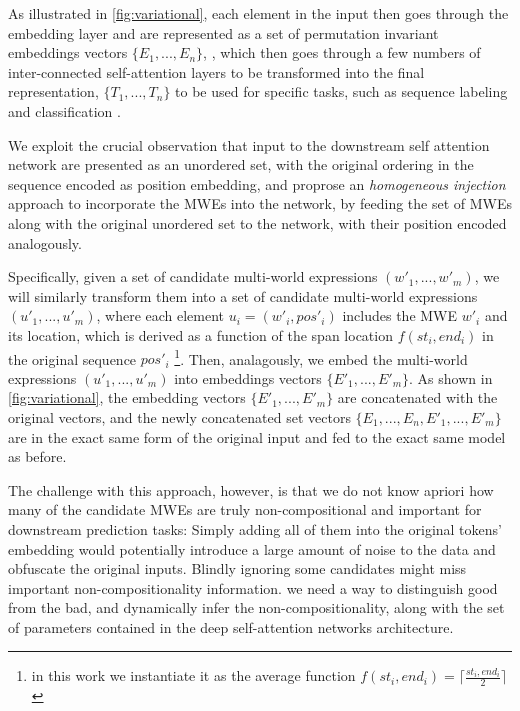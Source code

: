 As illustrated in \autoref{fig:variational}, each element in the input then goes through the embedding layer and are represented as a set of permutation invariant embeddings vectors $\{E_1, ..., E_n\}$, 
\cite{vaswani2017attention}, 
which then goes through a few numbers of inter-connected self-attention layers to be transformed into the final representation, 
$\{T_1, ..., T_n\}$ to be used for specific tasks, such as sequence labeling and classification \cite{devlin2018bert}.

We exploit the crucial observation that input to the downstream self attention network are presented as an unordered set, with the original ordering in the sequence encoded as position embedding,
and proprose an \textit{homogeneous injection} approach to incorporate the MWEs into the network, by feeding the set of MWEs along with the original unordered set to the network, with their position encoded analogously.


Specifically, given a set of candidate multi-world expressions $(w'_1, ..., w'_m)$, 
we will similarly transform them into a set of candidate multi-world expressions $(u'_1, ..., u'_m)$, where each element $u_i=(w'_i, pos'_i)$ includes the MWE $w'_i$ and its location, which is derived as a function of the span location $f(st_i, end_i)$ in the original sequence $pos'_i$ \footnote{in this work we instantiate it as the average function $f(st_i, end_i) = \lceil \frac{st_i, end_i}{2} \rceil $}.
Then, analagously, we embed the multi-world expressions $(u'_1, ..., u'_m)$ into embeddings vectors $\{E'_1, ..., E'_m\}$.
As shown in \autoref{fig:variational}, the embedding vectors $\{E'_1, ..., E'_m\}$ are concatenated with the original vectors, and the newly concatenated set vectors 
$\{E_1, ..., E_n, E'_1, ..., E'_m\}$ are in the exact same form of the original input and fed to the exact same model as before.

The challenge with this approach, however, is that we do not know apriori how many of the candidate MWEs are truly non-compositional and  important for downstream prediction tasks:
Simply adding all of them into the original tokens' embedding would potentially introduce a large amount of noise to the data and obfuscate the original inputs. Blindly ignoring some candidates might miss important non-compositionality information.
we need a way to distinguish good from the bad, and dynamically infer the non-compositionality, along with the set of parameters contained in the deep self-attention networks architecture.

